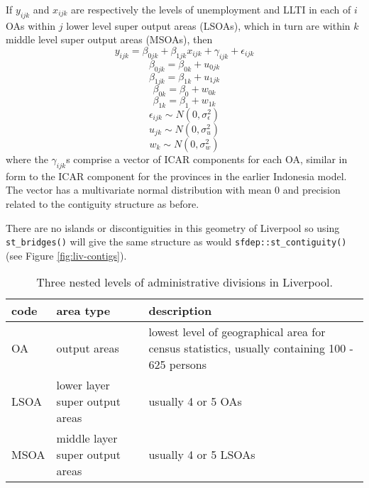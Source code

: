 If \(y_{ijk}\) and \(x_{ijk}\) are respectively the levels of unemployment and LLTI in each of \(i\) OAs within \(j\) lower level super output areas (LSOAs), which in turn are within \(k\) middle level super output areas (MSOAs), then
\begin{equation}
y_{ijk} = \beta_{0jk} + \beta_{1jk}x_{ijk} + \gamma_{ijk} + \epsilon_{ijk}
\label{eq:eq9}
\end{equation}
\begin{equation}
\beta_{0jk} = \beta_{0k} + u_{0jk}
\label{eq:eq10}
\end{equation}
\begin{equation}
\beta_{1jk} = \beta_{1k} + u_{1jk}
\label{eq:eq11}
\end{equation}
\begin{equation}
\beta_{0k} = \beta_0 + w_{0k}
\label{eq:eq12}
\end{equation}
\begin{equation}
\beta_{1k} = \beta_1 + w_{1k}
\label{eq:eq13}
\end{equation}
\begin{equation}
\epsilon_{ijk} \sim N(0,\sigma_{\epsilon}^2)
\label{eq:eq14}
\end{equation}
\begin{equation}
u_{jk} \sim N(0,\sigma_{u}^2)
\label{eq:eq15}
\end{equation}
\begin{equation}
 w_{k} \sim N(0,\sigma_{w}^2)
\label{eq:eq16}
\end{equation}
where the \(\gamma_{ijk}\)s comprise a vector of ICAR components for each OA, similar in form to the ICAR component for the provinces in the earlier Indonesia model. The vector has a multivariate normal distribution with mean 0 and precision related to the contiguity structure as before.

There are no islands or discontiguities in this geometry of Liverpool so using \texttt{st\_bridges()} will give the same structure as would \texttt{sfdep::st\_contiguity()} (see Figure \ref{fig:liv-contigs}).

\begin{table}

\caption{\label{tab:livadmin-latex}Three nested levels of administrative divisions in Liverpool.}
\centering
\fontsize{8}{10}\selectfont
\begin{tabular}[t]{l|l|>{\raggedright\arraybackslash}p{7cm}}
\hline
\textbf{code} & \textbf{area type} & \textbf{description}\\
\hline
OA & output areas & lowest level of geographical area for census statistics, usually containing 100 - 625 persons\\
\hline
LSOA & lower layer super output areas & usually 4 or 5 OAs\\
\hline
MSOA & middle layer super output areas & usually 4 or 5 LSOAs\\
\hline
\end{tabular}
\end{table}

